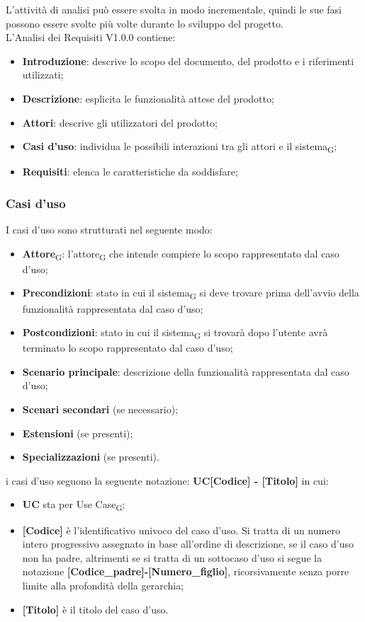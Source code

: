L'attività di analisi può essere svolta in modo incrementale, quindi le sue fasi possono essere svolte più volte durante lo sviluppo del progetto. 
\\
L'Analisi dei Requisiti V1.0.0 contiene:
\begin{itemize}
    \item \textbf{Introduzione}: descrive lo scopo del documento, del prodotto e i riferimenti utilizzati;
    \item \textbf{Descrizione}: esplicita le funzionalità attese del prodotto;
    \item \textbf{Attori}: descrive gli utilizzatori del prodotto;
    \item \textbf{Casi d'uso}: individua le possibili interazioni tra gli attori e il sistema\textsubscript{G};
    \item \textbf{Requisiti}: elenca le caratteristiche da soddisfare;
\end{itemize}
\subsubsection{Casi d'uso}
I casi d’uso sono strutturati nel seguente modo:
\begin{itemize}
    \item \textbf{Attore}\textsubscript{G}: l’attore\textsubscript{G} che intende compiere lo scopo rappresentato dal caso d’uso;
    \item \textbf{Precondizioni}: stato in cui il sistema\textsubscript{G} si deve trovare prima dell’avvio della funzionalità rappresentata dal caso d’uso;
    \item \textbf{Postcondizioni}: stato in cui il sistema\textsubscript{G} si trovarà dopo l'utente avrà terminato lo scopo rappresentato dal caso d’uso;
    \item \textbf{Scenario principale}: descrizione della funzionalità rappresentata dal caso d’uso;
    \item \textbf{Scenari secondari} (se necessario);
    \item \textbf{Estensioni} (se presenti);
    \item \textbf{Specializzazioni} (se presenti).
\end{itemize}
i casi d'uso seguono la seguente notazione: \textbf{UC[Codice] - [Titolo]} in cui:
\begin{itemize}
    \item \textbf{UC} sta per Use Case\textsubscript{G};
    \item \textbf{[Codice]} è l'identificativo univoco del caso d'uso. Si tratta di un numero intero progressivo assegnato in base all'ordine di descrizione, se il caso d'uso non ha padre, altrimenti se si tratta di un sottocaso d'uso si segue la notazione\textbf{ [Codice\_padre]-[Numero\_figlio]}, ricorsivamente senza porre limite alla profondità della gerarchia;
    \item \textbf{[Titolo]} è il titolo del caso d'uso.
\end{itemize}

